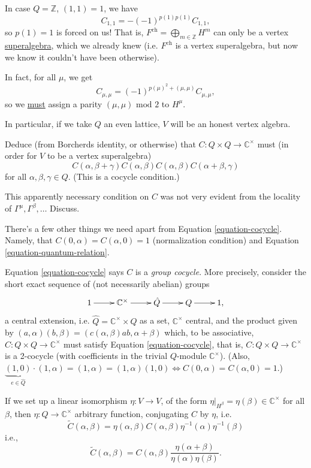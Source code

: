 In case $Q=\mathbb{Z}$, $(1,1)=1$,
we have
$$
C_{1,1}=-(-1)^{p(1)p(1)}C_{1,1},
$$
so $p(1)=1$ is forced on us! That is,
$F^{\text{ch}}=\bigoplus_{m \in
\mathbb{Z}}H^m$ can only be
a vertex \underline{superalgebra},
which we already knew (i.e. $F^\text{ch}$ is
a vertex superalgebra,
but now we know it couldn't have been
otherwise).

In fact, for all $\mu$, we get
$$
C_{\mu,\mu}=(-1)^{p(\mu)^2+(\mu,\mu)}C_{\mu,
\mu},
$$
so we \underline{must} assign a parity
$(\mu,\mu)\text{ mod }2$
to $H^\mu$.

In particular, if we take $Q$ an even
lattice,
$V$ will be an honest vertex algebra.

\begin{exercise}
\label{exercise-cocycle}
Deduce (from Borcherds identity, or
otherwise)
that $C:Q \times Q\to \mathbb{C}^\times$
must (in order for $V$ to be a vertex
superalgebra)
\begin{equation}
\label{equation-cocycle}
C(\alpha,\beta+\gamma)C(\alpha,\beta)
C(\alpha,\beta)C(\alpha+\beta,\gamma)
\end{equation}
for all $\alpha,\beta,\gamma \in Q$. (This is
a cocycle condition.)

This apparently necessary condition on $C$
was not very evident
from the locality of
$\Gamma^\mu,\Gamma^\beta,\ldots$ Discuss.
\end{exercise}

\noindent
There's a few other things we need apart from
Equation \ref{equation-cocycle}.
Namely, that $C(0,\alpha)=C(\alpha,0)=1$
(normalization condition)
and Equation \ref{equation-quantum-relation}.

Equation \ref{equation-cocycle} says $C$ is a
{\it group cocycle}.
More precisely, consider the short exact
sequence of
(not necessarily abelian) groups
$$
\xymatrix{
1\ar[r]&\mathbb{C}^\times\ar[r]&\hat{Q}\ar[r]
&Q\ar[r]&1,
}
$$
a central extension, i.e.
$\hat{Q}=\mathbb{C}^\times \times Q$
as a set, $\mathbb{C}^\times$ central, and
the product given by
$(a,\alpha)(b,\beta)=(c(\alpha,\beta)ab,
\alpha+\beta)$
which, to be associative,
$C:Q \times Q \to \mathbb{C}^\times$ must
satisfy
Equation \ref{equation-cocycle}, that is,
$C:Q \times Q \to \mathbb{C}^\times$
is a 2-cocycle
(with coefficients in the trivial $Q$-module
$\mathbb{C}^\times$).
(Also, $\underbrace{(1,0)}_{e \in
\hat{Q}}\cdot(1,\alpha)=(1,\alpha)=
(1,\alpha)(1,0)\iff
C(0,\alpha)=C(\alpha,0)=1$.)

\begin{remark}
\label{remark-isomorphism}
If we set up a linear isomorphism
$\eta:V \to V$, of the form
$\eta|_{H^\beta}=\eta(\beta) \in
\mathbb{C}^\times$ for all $\beta$,
then $\eta:Q \to \mathbb{C}^\times$ arbitrary
function,
conjugating $C$ by $\eta$, i.e.
$$
\tilde{C}(\alpha,\beta)=
\eta(\alpha,\beta)C(\alpha,\beta)\eta^{-1}
(\alpha)\eta^{-1}(\beta)
$$
i.e.,
$$
\tilde{C}(\alpha,\beta)=C(\alpha,\beta)
\frac{\eta(\alpha+\beta)}
{\eta(\alpha)\eta(\beta)}.
$$
\end{remark}

